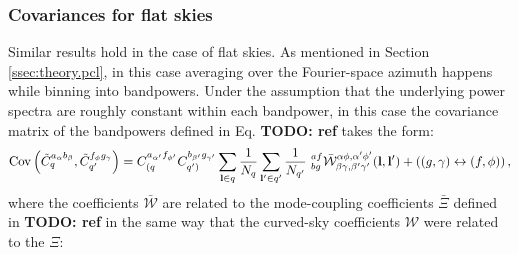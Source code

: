 \documentclass[a4paper,11pt]{article}
\newcommand{\todo}[1]{{\bf TODO: #1}}
\begin{document}
    \subsubsection{Covariances for flat skies}
      Similar results hold in the case of flat skies. As mentioned in Section \ref{ssec:theory.pcl}, in this case averaging over the Fourier-space azimuth happens while binning into bandpowers. Under the assumption that the underlying power spectra are roughly constant within each bandpower, in this case the covariance matrix of the bandpowers defined in Eq. \todo{ref} takes the form:
      \begin{equation}\label{eq:cov_flat}
        {\rm Cov}\left(\tilde{C}^{a_\alpha b_\beta}_q,\tilde{C}^{f_\phi g_\gamma}_{q'}\right) = C^{a_{\alpha'} f_{\phi'}}_{(q}C^{b_{\beta'} g_{\gamma'}}_{q')}\sum_{{\bf l}\in q} \frac{1}{N_q} \sum_{{\bf l}' \in q'} \frac{1}{N_{q'}}\,\,^{af}_{bg}\bar{\mathcal{W}}^{\alpha\phi,\alpha'\phi'}_{\beta\gamma,\beta'\gamma'}({\bf l},{\bf l}')+\left((g,\gamma)\leftrightarrow(f,\phi)\right),
      \end{equation}
      where the coefficients $\bar{\mathcal{W}}$ are related to the mode-coupling coefficients $\bar{\Xi}$ defined in \todo{ref} in the same way that the curved-sky coefficients $\mathcal{W}$ were related to the $\Xi$:
\end{document}
